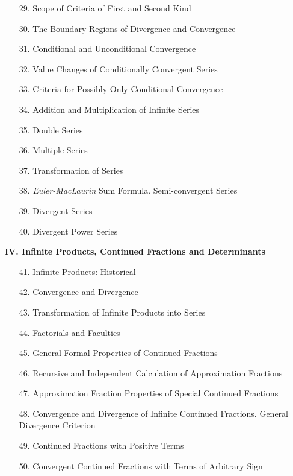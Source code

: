 {\fontsize{10}{0}\selectfont
\begin{enumerate}[itemsep=-1pt]
    \item[29.] Scope of Criteria of First and Second Kind
    \item[30.] The Boundary Regions of Divergence and Convergence
    \item[31.] Conditional and Unconditional Convergence
    \item[32.] Value Changes of Conditionally Convergent Series
    \item[33.] Criteria for Possibly Only Conditional Convergence
    \item[34.] Addition and Multiplication of Infinite Series
    \item[35.] Double Series
    \item[36.] Multiple Series
    \item[37.] Transformation of Series
    \item[38.] \textit{Euler-MacLaurin} Sum Formula. Semi-convergent Series
    \item[39.] Divergent Series
    \item[40.] Divergent Power Series
\end{enumerate}
\begin{center}
    \textbf{\small{IV. Infinite Products, Continued Fractions and Determinants}}
\end{center}
\begin{enumerate}[itemsep=-1pt]
    \item[41.] Infinite Products: Historical
    \item[42.] Convergence and Divergence
    \item[43.] Transformation of Infinite Products into Series
    \item[44.] Factorials and Faculties
    \item[45.] General Formal Properties of Continued Fractions
    \item[46.] Recursive and Independent Calculation of Approximation Fractions
    \item[47.] Approximation Fraction Properties of Special Continued Fractions
    \item[48.] Convergence and Divergence of Infinite Continued Fractions. General Divergence Criterion
    \item[49.] Continued Fractions with Positive Terms
    \item[50.] Convergent Continued Fractions with Terms of Arbitrary Sign

\end{enumerate}}
